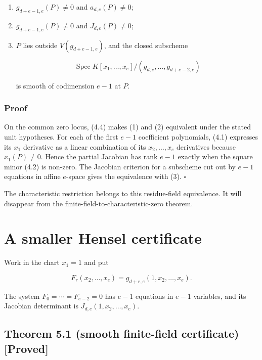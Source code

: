 \documentclass[
]{article}
\begin{document}
\begin{enumerate}
\def\labelenumi{\arabic{enumi}.}
\item
  \(g_{d+e-1,e}(P)\ne0\) and \(a_{d,e}(P)\ne0\);
\item
  \(g_{d+e-1,e}(P)\ne0\) and \(J_{d,e}(P)\ne0\);
\item
  \(P\) lies outside \(V(g_{d+e-1,e})\), and the closed subscheme

  \[
  \operatorname{Spec}K[x_1,\ldots,x_e]/
  (g_{d,e},\ldots,g_{d+e-2,e})
  \]

  is smooth of codimension \(e-1\) at \(P\).
\end{enumerate}

\subsubsection*{Proof}\label{proof-4}

On the common zero locus, (4.4) makes (1) and (2) equivalent under the
stated unit hypotheses. For each of the first \(e-1\) coefficient
polynomials, (4.1) expresses its \(x_1\) derivative as a linear
combination of its \(x_2,\ldots,x_e\) derivatives because
\(x_1(P)\ne0\). Hence the partial Jacobian has rank \(e-1\) exactly when
the square minor (4.2) is non-zero. The Jacobian criterion for a
subscheme cut out by \(e-1\) equations in affine \(e\)-space gives the
equivalence with (3). \(\square\)

The characteristic restriction belongs to this residue-field
equivalence. It will disappear from the
finite-field-to-characteristic-zero theorem.

\section{A smaller Hensel
certificate}\label{a-smaller-hensel-certificate}

Work in the chart \(x_1=1\) and put

\[
F_r(x_2,\ldots,x_e)=g_{d+r,e}(1,x_2,\ldots,x_e).
\tag{5.1}
\]

The system \(F_0=\cdots=F_{e-2}=0\) has \(e-1\) equations in \(e-1\)
variables, and its Jacobian determinant is
\(J_{d,e}(1,x_2,\ldots,x_e)\).

\subsection*{Theorem 5.1 (smooth finite-field certificate)
{[}Proved{]}}\label{theorem-5.1-smooth-finite-field-certificate-proved}
\end{document}
